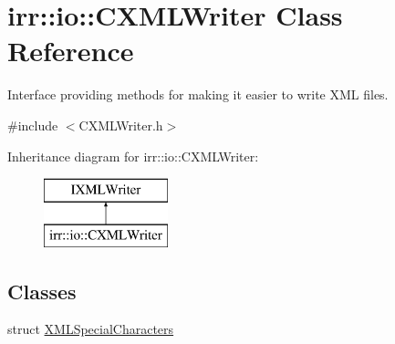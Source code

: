 \hypertarget{classirr_1_1io_1_1_c_x_m_l_writer}{\section{irr\-:\-:io\-:\-:C\-X\-M\-L\-Writer Class Reference}
\label{classirr_1_1io_1_1_c_x_m_l_writer}
}


Interface providing methods for making it easier to write X\-M\-L files.  




{\ttfamily \#include $<$C\-X\-M\-L\-Writer.\-h$>$}

Inheritance diagram for irr\-:\-:io\-:\-:C\-X\-M\-L\-Writer\-:\begin{figure}[H]
\begin{center}
\leavevmode
\includegraphics[height=2.000000cm]{classirr_1_1io_1_1_c_x_m_l_writer}
\end{center}
\end{figure}
\subsection*{Classes}
\begin{DoxyCompactItemize}
\item 
struct \hyperlink{structirr_1_1io_1_1_c_x_m_l_writer_1_1_x_m_l_special_characters}{X\-M\-L\-Special\-Characters}
\end{DoxyCompactItemize}
